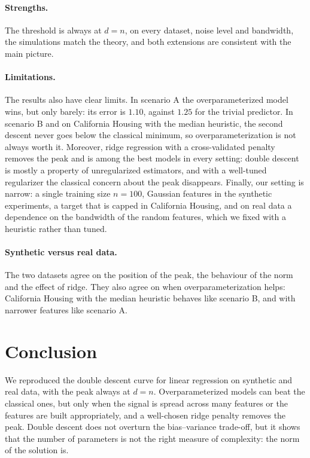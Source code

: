 \documentclass[11pt,a4paper]{article}
\begin{document}
\paragraph{Strengths.}
The threshold is always at $d = n$, on every dataset, noise level and
bandwidth, the simulations match the theory, and both extensions are
consistent with the main picture.

\paragraph{Limitations.}
The results also have clear limits. In scenario A the overparameterized
model wins, but only barely: its error is $1.10$, against $1.25$ for the
trivial predictor. In scenario B and on California Housing with the median
heuristic, the second descent never goes below the classical minimum, so
overparameterization is not always worth it. Moreover, ridge regression
with a cross-validated penalty removes the peak and is among the best
models in every setting: double descent is mostly a property of unregularized estimators,
and with a well-tuned regularizer the classical concern about the peak
disappears. Finally, our setting is narrow: a single training size
$n = 100$, Gaussian features in the synthetic experiments, a target that is
capped in California Housing, and on real data a dependence on the
bandwidth of the random features, which we fixed with a heuristic rather
than tuned.

\paragraph{Synthetic versus real data.}
The two datasets agree on the position of the peak, the behaviour of the
norm and the effect of ridge. They also agree on when overparameterization
helps: California Housing with the median heuristic behaves like
scenario B, and with narrower features like scenario A.


\section{Conclusion}

We reproduced the double descent curve for linear regression on synthetic
and real data, with the peak always at $d = n$. Overparameterized models can
beat the classical ones, but only when the signal is spread across many
features or the features are built appropriately, and a well-chosen ridge
penalty removes the peak. Double descent
does not overturn the bias--variance trade-off, but it shows that the
number of parameters is not the right measure of complexity: the norm of
the solution is.


\end{document}
